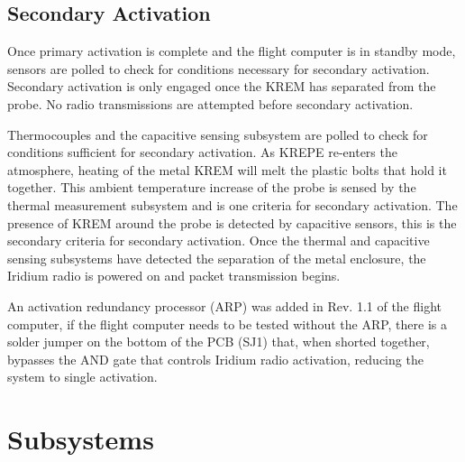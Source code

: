 \documentclass{article}
\begin{document}
\subsection{Secondary Activation}
\label{sec:secondary-activation}
Once primary activation is complete and the flight computer is in standby mode, sensors are polled to check for conditions necessary for secondary activation. Secondary activation is only engaged once the KREM has separated from the probe. No radio transmissions are attempted before secondary activation. 

Thermocouples and the capacitive sensing subsystem are polled to check for conditions sufficient for secondary activation. As KREPE re-enters the atmosphere, heating of the metal KREM will melt the plastic bolts that hold it together. This ambient temperature increase of the probe is sensed by the thermal measurement subsystem and is one criteria for secondary activation. The presence of KREM around the probe is detected by capacitive sensors, this is the secondary criteria for secondary activation. Once the thermal and capacitive sensing subsystems have detected the separation of the metal enclosure, the Iridium radio is powered on and packet transmission begins.  

An activation redundancy processor (ARP) was added in Rev. 1.1 of the flight computer, if the flight computer needs to be tested without the ARP, there is a solder jumper on the bottom of the PCB (SJ1) that, when shorted together, bypasses the AND gate that controls Iridium radio activation, reducing the system to single activation.




\section{Subsystems}
\label{sec:subsystems}
\end{document}
